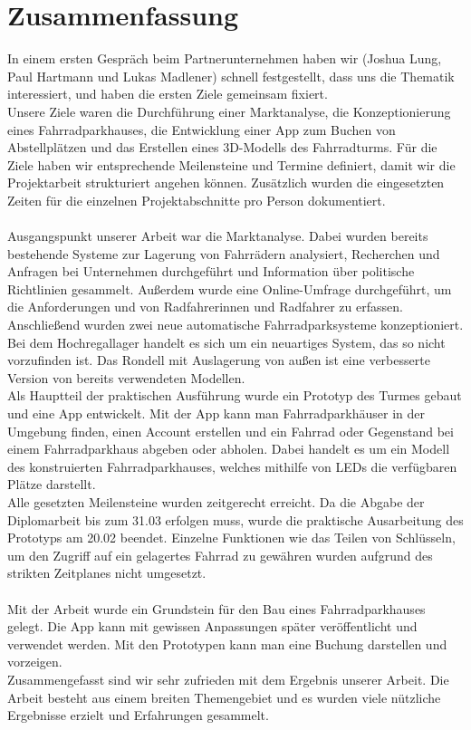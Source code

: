 \section{Zusammenfassung}

In einem ersten Gespräch beim Partnerunternehmen haben wir (Joshua Lung, Paul Hartmann und Lukas Madlener) schnell festgestellt, dass uns die Thematik interessiert, und haben die ersten Ziele gemeinsam fixiert. \\
Unsere Ziele waren die Durchführung einer Marktanalyse, die Konzeptionierung eines Fahrradparkhauses, die Entwicklung einer App zum Buchen von Abstellplätzen und das Erstellen eines 3D-Modells des Fahrradturms. Für die Ziele haben wir entsprechende Meilensteine und Termine definiert, damit wir die Projektarbeit strukturiert angehen können. Zusätzlich wurden die eingesetzten Zeiten für die einzelnen Projektabschnitte pro Person dokumentiert.\\ \\
Ausgangspunkt unserer Arbeit war die Marktanalyse. Dabei wurden bereits bestehende Systeme zur Lagerung von Fahrrädern analysiert, Recherchen und Anfragen bei Unternehmen durchgeführt und Information über politische Richtlinien gesammelt. Außerdem wurde eine Online-Umfrage durchgeführt, um die Anforderungen und von Radfahrerinnen und Radfahrer zu erfassen.\\
Anschließend wurden zwei neue automatische Fahrradparksysteme konzeptioniert. Bei dem Hochregallager handelt es sich um ein neuartiges System, das so nicht vorzufinden ist. Das Rondell mit Auslagerung von außen ist eine verbesserte Version von bereits verwendeten Modellen.\\
Als Hauptteil der praktischen Ausführung wurde ein Prototyp des Turmes gebaut und eine App entwickelt. Mit der App kann man Fahrradparkhäuser in der Umgebung finden, einen Account erstellen und ein Fahrrad oder Gegenstand bei einem Fahrradparkhaus abgeben oder abholen. Dabei handelt es um ein Modell des konstruierten Fahrradparkhauses, welches mithilfe von LEDs die verfügbaren Plätze darstellt. \\
Alle gesetzten Meilensteine wurden zeitgerecht erreicht. Da die Abgabe der Diplomarbeit bis zum 31.03 erfolgen muss, wurde die praktische Ausarbeitung des Prototyps am 20.02 beendet. Einzelne Funktionen wie das Teilen von Schlüsseln, um den Zugriff auf ein gelagertes Fahrrad zu gewähren wurden aufgrund des strikten Zeitplanes nicht umgesetzt.\\ \\

Mit der Arbeit wurde ein Grundstein für den Bau eines Fahrradparkhauses gelegt. Die App kann mit gewissen Anpassungen später veröffentlicht und verwendet werden. Mit den Prototypen kann man eine Buchung darstellen und vorzeigen.\\
Zusammengefasst sind wir sehr zufrieden mit dem Ergebnis unserer Arbeit. Die Arbeit besteht aus einem breiten Themengebiet und es wurden viele nützliche Ergebnisse erzielt und Erfahrungen gesammelt.\\
